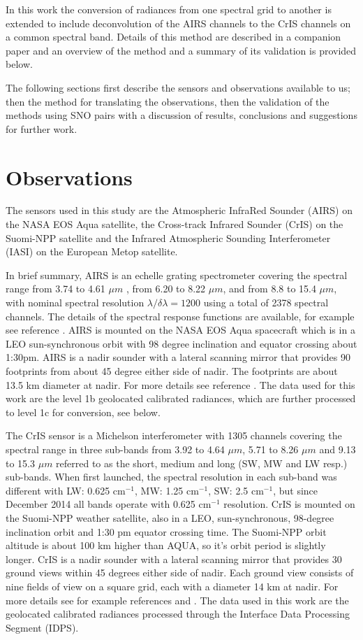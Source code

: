 \documentclass[twocolumn,10pt]{article}
\begin{document}
In this work the conversion of radiances from one spectral grid to another is extended to include deconvolution of the AIRS channels to the CrIS channels on a common spectral band. Details of this method are described in a companion paper \cite{Motteler2017a} and an overview of the method and a summary of its validation is provided below. 

The following sections first describe the sensors and observations available to us; then the method for translating the observations, then the validation of the methods using SNO pairs with a discussion of results, conclusions and suggestions for further work.

\section{Observations}

The sensors used in this study are the Atmospheric InfraRed Sounder (AIRS) on the NASA EOS Aqua satellite, the Cross-track Infrared Sounder (CrIS) on the Suomi-NPP satellite and the Infrared Atmospheric Sounding Interferometer (IASI) on the European Metop satellite.

In brief summary, AIRS is an echelle grating spectrometer covering the spectral range from 3.74 to 4.61 $\mu m$ , from 6.20 to 8.22 $\mu m$, and from 8.8 to 15.4 $\mu m$, with nominal spectral resolution $\lambda/\delta\lambda= 1200$ using a total of 2378 spectral channels. The details of the spectral response functions are available, for example see reference \cite{airscalib}. AIRS is mounted on the NASA EOS Aqua spacecraft which is in a LEO sun-synchronous orbit with 98 degree inclination and equator crossing about 1:30pm. AIRS is a nadir sounder with a lateral scanning mirror that provides 90 footprints from about 45 degree either side of nadir. The footprints are about 13.5 km diameter at nadir. For more details see reference \cite{airseos}. The data used for this work are the level 1b geolocated calibrated radiances, which are further processed to level 1c for conversion, see below.

The CrIS sensor is a Michelson interferometer with 1305 channels covering the spectral range in three sub-bands from 3.92 to 4.64 $\mu m$, 5.71 to 8.26 $\mu m$ and 9.13 to 15.3 $\mu m$ referred to as the short, medium and long (SW, MW and LW resp.) sub-bands. When first launched, the spectral resolution in each sub-band was different with LW: 0.625 cm$^{-1}$, MW: 1.25 cm$^{-1}$, SW: 2.5 cm$^{-1}$, but since December 2014 all bands operate with 0.625 cm$^{-1}$ resolution. CrIS is mounted on the Suomi-NPP weather satellite, also in a LEO, sun-synchronous, 98-degree inclination orbit and 1:30 pm equator crossing time. The Suomi-NPP orbit altitude is about 100 km higher than AQUA, so it's orbit period is slightly longer. CrIS is a nadir sounder with a lateral scanning mirror that provides 30 ground views within 45 degrees either side of nadir. Each ground view consists of nine fields of view on a square grid, each with a diameter 14 km at nadir. For more details see for example references \cite{crisweb} and \cite{criscal}. The data used in this work are the geolocated calibrated radiances processed through the Interface Data Processing Segment (IDPS).
\end{document}
